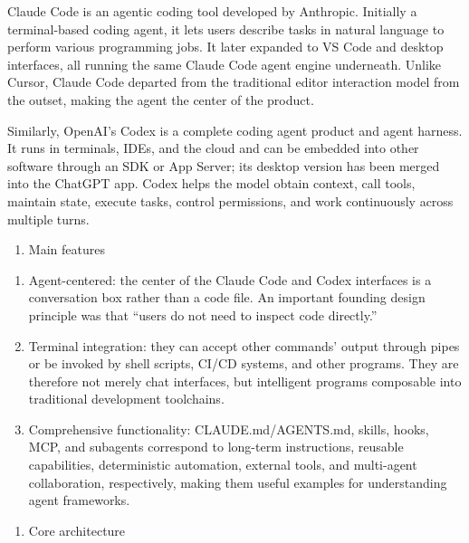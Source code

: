 Claude Code is an agentic coding tool developed by Anthropic. Initially a terminal-based coding agent, it lets users describe tasks in natural language to perform various programming jobs. It later expanded to VS Code and desktop interfaces, all running the same Claude Code agent engine underneath. Unlike Cursor, Claude Code departed from the traditional editor interaction model from the outset, making the agent the center of the product.

Similarly, OpenAI's Codex is a complete coding agent product and agent harness. It runs in terminals, IDEs, and the cloud and can be embedded into other software through an SDK or App Server; its desktop version has been merged into the ChatGPT app. Codex helps the model obtain context, call tools, maintain state, execute tasks, control permissions, and work continuously across multiple turns.

\begin{enumerate}
\def\labelenumi{(\Roman{enumi})}
\tightlist
\item
  Main features
\end{enumerate}

\begin{enumerate}
\def\labelenumi{\arabic{enumi}.}
\item
  Agent-centered: the center of the Claude Code and Codex interfaces is a conversation box rather than a code file. An important founding design principle was that ``users do not need to inspect code directly.''
\item
  Terminal integration: they can accept other commands' output through pipes or be invoked by shell scripts, CI/CD systems, and other programs. They are therefore not merely chat interfaces, but intelligent programs composable into traditional development toolchains.
\item
  Comprehensive functionality: CLAUDE.md/AGENTS.md, skills, hooks, MCP, and subagents correspond to long-term instructions, reusable capabilities, deterministic automation, external tools, and multi-agent collaboration, respectively, making them useful examples for understanding agent frameworks.
\end{enumerate}

\begin{enumerate}
\def\labelenumi{(\Roman{enumi})}
\setcounter{enumi}{1}
\tightlist
\item
  Core architecture
\end{enumerate}

